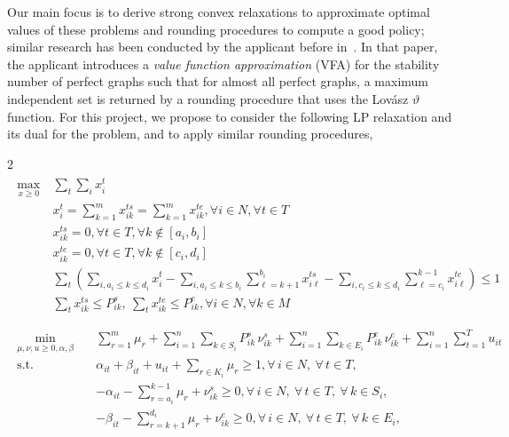 \documentclass{article}
\begin{document}
Our main focus is to derive strong convex relaxations to approximate optimal values of these problems and rounding procedures to compute a good policy;
similar research has been conducted by the applicant before in~\cite{gong2025roundinglovaszthetafunction}.
In that paper, the applicant introduces a \emph{value function approximation} (VFA) for the stability number of perfect graphs such that for almost all perfect graphs, a maximum independent set is returned by a rounding procedure that uses the Lov{\'a}sz $\vartheta$ function. %
For this project, we propose to consider the following LP relaxation and its dual for the problem, and to apply similar rounding procedures,
\begin{multicols}{2}
\noindent
    \begin{align*}
    \begin{split}
            \max_{x\geq 0}~&\sum_t \sum_i x_{i}^{t}\\
    &x_i^t =\sum_{k=1}^{m}x_{ik}^{ts}=\sum_{k=1}^{m}x_{ik}^{te}, \forall i\in N,\forall t\in T\\
    &x_{ik}^{ts}=0,\forall t\in T,\forall k\notin [a_i,b_i]\\
    &x_{ik}^{te}=0,\forall t\in T,\forall k\notin [c_i,d_i]\\
    &\sum_{t}\left(\sum_{i, a_i\leq k\leq d_i} x_i^t-\sum_{i,a_i\leq k\leq b_i}\sum_{\ell = k+1}^{b_i}x_{i\ell}^{ts}-\sum_{i,c_i\leq k\leq d_i}\sum_{\ell =c_i}^{k-1}x_{i\ell}^{te}\right)\leq 1\\
    &\sum_{t}x_{ik}^{ts}\leq P_{ik}^{s},~\sum_{t}x_{ik}^{te}\leq P_{ik}^{e},\forall i\in N,\forall k\in M\\
    \end{split}
\end{align*}
\columnbreak
\begin{align*}
\begin{split}
\min_{\mu,\nu,u\geq 0,\alpha,\beta}\quad 
& \sum_{r=1}^{m} \mu_r
  + \sum_{i=1}^{n}\sum_{k\in S_i} P^s_{ik}\,\nu^s_{ik}
  + \sum_{i=1}^{n}\sum_{k\in E_i} P^e_{ik}\,\nu^e_{ik}
  + \sum_{i=1}^{n}\sum_{t=1}^{T} u_{it}\\
\text{s.t.}\quad 
& \alpha_{it} + \beta_{it} + u_{it} + \sum_{r\in K_i} \mu_r \geq 1,
\forall\, i\in N,\ \forall\, t\in T, \\
& -\alpha_{it} -\sum_{r=a_i}^{k-1} \mu_r+\nu^s_{ik}\geq0,\forall\, i\in N,\ \forall\, t\in T,\ \forall\, k\in S_i, \\
& -\beta_{it}-\sum_{r=k+1}^{d_i} \mu_r+\nu^e_{ik}\geq 0,\forall\, i\in N,\ \forall\, t\in T,\ \forall\, k\in E_i,
\end{split}
\end{align*}
\noindent
\end{multicols}
\end{document}
